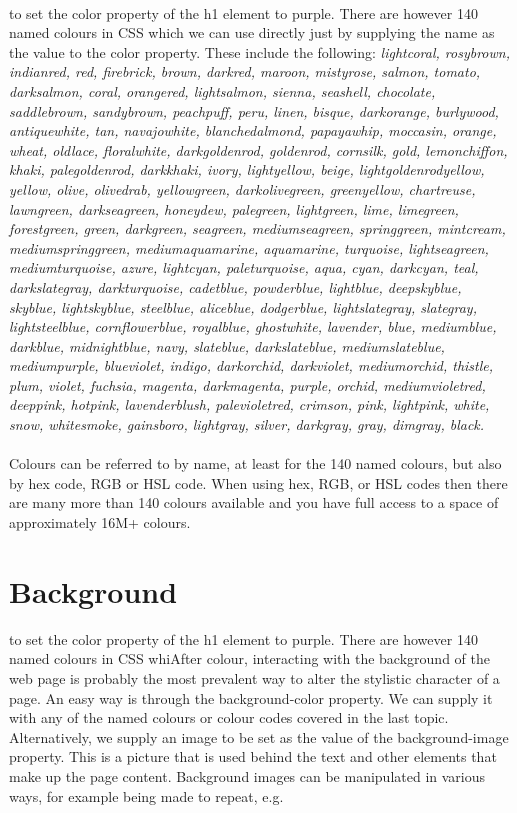 \paragraph{} to set the color property of the h1 element to purple. There are however 140 named colours in CSS which we can use directly just by supplying the name as the value to the color property. These include the following: \emph{lightcoral, rosybrown, indianred, red, firebrick, brown, darkred, maroon, mistyrose, salmon, tomato, darksalmon, coral, orangered, lightsalmon, sienna, seashell, chocolate, saddlebrown, sandybrown, peachpuff, peru, linen, bisque, darkorange, burlywood, antiquewhite, tan, navajowhite, blanchedalmond, papayawhip, moccasin, orange, wheat, oldlace, floralwhite, darkgoldenrod, goldenrod, cornsilk, gold, lemonchiffon, khaki, palegoldenrod, darkkhaki, ivory, lightyellow, beige, lightgoldenrodyellow, yellow, olive, olivedrab, yellowgreen, darkolivegreen, greenyellow, chartreuse, lawngreen, darkseagreen, honeydew, palegreen, lightgreen, lime, limegreen, forestgreen, green, darkgreen, seagreen, mediumseagreen, springgreen, mintcream, mediumspringgreen, mediumaquamarine, aquamarine, turquoise, lightseagreen, mediumturquoise, azure, lightcyan, paleturquoise, aqua, cyan, darkcyan, teal, darkslategray, darkturquoise, cadetblue, powderblue, lightblue, deepskyblue, skyblue, lightskyblue, steelblue, aliceblue, dodgerblue, lightslategray, slategray, lightsteelblue, cornflowerblue, royalblue, ghostwhite, lavender, blue, mediumblue, darkblue, midnightblue, navy, slateblue, darkslateblue, mediumslateblue, mediumpurple, blueviolet, indigo, darkorchid, darkviolet, mediumorchid, thistle, plum, violet, fuchsia, magenta, darkmagenta, purple, orchid, mediumvioletred, deeppink, hotpink, lavenderblush, palevioletred, crimson, pink, lightpink, white, snow, whitesmoke, gainsboro, lightgray, silver, darkgray, gray, dimgray, black.}

\paragraph{} Colours can be referred to by name, at least for the 140 named colours, but also by hex code, RGB or HSL code. When using hex, RGB, or HSL codes then there are many more than 140 colours available and you have full access to a space of approximately 16M+ colours.


\section{Background}
 to set the color property of the h1 element to purple. There are however 140 named colours in CSS whiAfter colour, interacting with the background of the web page is probably the most prevalent way to alter the stylistic character of a page. An easy way is through the background-color property. We can supply it with any of the named colours or colour codes covered in the last topic. Alternatively, we supply an image to be set as the value of the background-image property. This is a picture that is used behind the text and other elements that make up the page content. Background images can be manipulated in various ways, for example being made to repeat, e.g.

